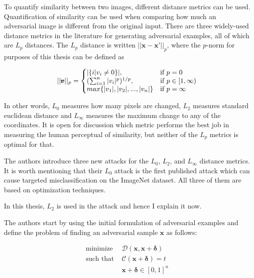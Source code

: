 
To quantify similarity between two images, different distance metrics can be used. Quantification of similarity can be used when comparing how much an adversarial image is different from the original input. There are three widely-used distance metrics in the literature for generating adversarial examples, all of which are $L_p$ distances. The $L_p$ distance is written $||\pmb x - \pmb x'||_p$, where the $p$-norm for purposes of this thesis can be defined as

\begin{equation}
  ||\pmb v||_p=\left\{
  \begin{array}{@{}ll@{}}
       |\{i | v_i \neq 0 \}|, & \text{if } p = 0 \\
    ( \sum_{i = 1}^{n} |v_i|^p)^{1/p}, & \text{if } p \in [1, \infty) \\
    max\{|v_1|, |v_2|, ..., |v_n|\} & \text{if } p = \infty
  \end{array}\right.
\end{equation} 

In other words, $L_0$ measures how many pixels are changed, $L_2$ measures standard euclidean distance and $L_\infty$ measures the maximum change to any of the coordinates. It is open for discussion which metric performs the best job in measuring the human perceptual of similarity, but neither of the $L_p$ metrics is optimal for that.


The authors \cite{DBLP:journals/corr/CarliniW16a} introduce three new attacks for the $L_0$, $L_2$, and $L_{ \infty }$ distance metrics. It is worth mentioning that their $L_0$ attack is the first published attack which can cause targeted misclassification on the ImageNet dataset. All three of them are based on optimization techniques.

In this thesis, $L_2$ is used in the attack and hence I explain it now.

The authors start by using the initial formulation of adversarial examples \cite{szegedy2013intriguing} and define the problem of finding an adversarial sample $\pmb x$ as follows:

\begin{align*}
\text{minimize } & \mathcal{D}(\pmb x, \pmb x + \pmb \delta) \\
\text{such that } & \mathcal{C} (\pmb x + \pmb \delta) = t \\
                  & \pmb x + \pmb \delta \in [0, 1]^n
\end{align*}


